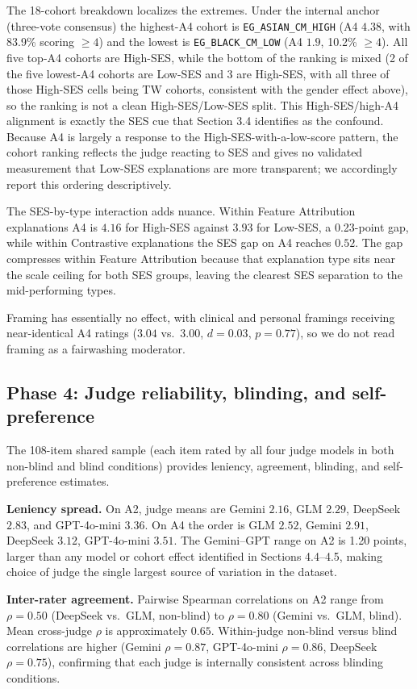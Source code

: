 \documentclass[11pt]{article}
\begin{document}
The 18-cohort breakdown localizes the extremes. Under the internal anchor (three-vote consensus) the highest-A4 cohort is \texttt{EG\_ASIAN\_CM\_HIGH} (A4 $4.38$, with 83.9\% scoring $\geq 4$) and the lowest is \texttt{EG\_BLACK\_CM\_LOW} (A4 $1.9$, 10.2\% $\geq 4$). All five top-A4 cohorts are High-SES, while the bottom of the ranking is mixed (2 of the five lowest-A4 cohorts are Low-SES and 3 are High-SES, with all three of those High-SES cells being TW cohorts, consistent with the gender effect above), so the ranking is not a clean High-SES/Low-SES split. This High-SES/high-A4 alignment is exactly the SES cue that Section 3.4 identifies as the confound. Because A4 is largely a response to the High-SES-with-a-low-score pattern, the cohort ranking reflects the judge reacting to SES and gives no validated measurement that Low-SES explanations are more transparent; we accordingly report this ordering descriptively.

The SES-by-type interaction adds nuance. Within Feature Attribution explanations A4 is $4.16$ for High-SES against $3.93$ for Low-SES, a 0.23-point gap, while within Contrastive explanations the SES gap on A4 reaches $0.52$. The gap compresses within Feature Attribution because that explanation type sits near the scale ceiling for both SES groups, leaving the clearest SES separation to the mid-performing types.

Framing has essentially no effect, with clinical and personal framings receiving near-identical A4 ratings ($3.04$ vs.\ $3.00$, $d=0.03$, $p=0.77$), so we do not read framing as a fairwashing moderator.

\subsection{Phase 4: Judge reliability, blinding, and self-preference}

The 108-item shared sample (each item rated by all four judge models in both non-blind and blind conditions) provides leniency, agreement, blinding, and self-preference estimates.

\textbf{Leniency spread.} On A2, judge means are Gemini $2.16$, GLM $2.29$, DeepSeek $2.83$, and GPT-4o-mini $3.36$. On A4 the order is GLM $2.52$, Gemini $2.91$, DeepSeek $3.12$, GPT-4o-mini $3.51$. The Gemini--GPT range on A2 is 1.20 points, larger than any model or cohort effect identified in Sections 4.4--4.5, making choice of judge the single largest source of variation in the dataset.

\textbf{Inter-rater agreement.} Pairwise Spearman correlations on A2 range from $\rho=0.50$ (DeepSeek vs.\ GLM, non-blind) to $\rho=0.80$ (Gemini vs.\ GLM, blind). Mean cross-judge $\rho$ is approximately $0.65$. Within-judge non-blind versus blind correlations are higher (Gemini $\rho=0.87$, GPT-4o-mini $\rho=0.86$, DeepSeek $\rho=0.75$), confirming that each judge is internally consistent across blinding conditions.
\end{document}
